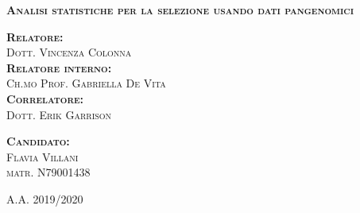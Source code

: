 \documentclass[
11pt, %
oneside, %
english, %
singlespacing, %
headsepline, %
chapterinoneline, %
]{MastersDoctoralThesis} %
\begin{document}
\begin{titlepage}
  \vspace{0.8cm}
{\scshape\large\normalfont\bfseries   Analisi statistiche per la selezione usando dati pangenomici
 \par} 
\vspace{1cm} 
\begin{minipage}{0.45\textwidth}
{\scshape\normalfont\large\bfseries Relatore:}\\
{\scshape\normalfont\large Dott. Vincenza Colonna} \\ 
{\scshape\normalfont\large\bfseries Relatore interno:} \\
{\scshape\normalfont\large Ch.mo Prof. Gabriella De Vita}\\
{\scshape\normalfont\large\bfseries Correlatore:} \\
{\scshape\normalfont\large Dott. Erik Garrison}
\end{minipage}
\hspace{2.5cm}
\begin{minipage}{0.25\textwidth}
{\scshape\normalfont\large\bfseries Candidato:}\\
 {\scshape\normalfont\large Flavia Villani \\
 matr. N79001438} 
\end{minipage}

\vfill
\centering
\vspace{0.48cm} 
{\scshape\Large\normalfont A.A. 2019/2020}

\end{titlepage}

\tableofcontents %




















\printbibliography[heading=bibintoc]

\begin{acknowledgements}
\addchaptertocentry{\acknowledgementname}
\end{acknowledgements}
\end{document}
